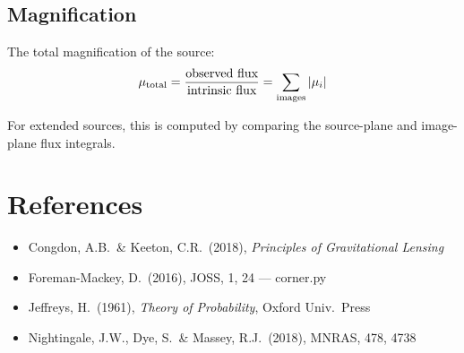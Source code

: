 \documentclass[11pt, letterpaper]{article}
\begin{document}
\subsection{Magnification}

The total magnification of the source:
\begin{equation}
\mu_{\rm total} = \frac{\text{observed flux}}{\text{intrinsic flux}}
= \sum_{\rm images} |\mu_i|
\end{equation}

For extended sources, this is computed by comparing the source-plane and
image-plane flux integrals.

\section*{References}

\begin{itemize}[nosep, leftmargin=*]
  \item Congdon, A.B.\ \& Keeton, C.R.\ (2018), \emph{Principles of Gravitational Lensing}
  \item Foreman-Mackey, D.\ (2016), JOSS, 1, 24 --- corner.py
  \item Jeffreys, H.\ (1961), \emph{Theory of Probability}, Oxford Univ.\ Press
  \item Nightingale, J.W., Dye, S.\ \& Massey, R.J.\ (2018), MNRAS, 478, 4738
\end{itemize}
\end{document}
